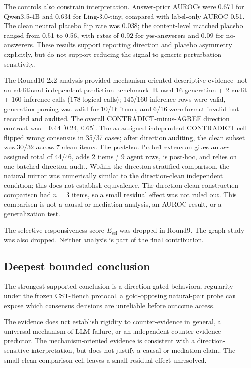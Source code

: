 \documentclass[11pt]{article}
\begin{document}
The controls also constrain interpretation. Answer-prior AUROCs were 0.671 for Qwen3.5-4B and 0.634 for Ling-3.0-tiny, compared with label-only AUROC 0.51. The clean neutral placebo flip rate was 0.038; the content-level matched placebo ranged from 0.51 to 0.56, with rates of 0.92 for yes-answerers and 0.09 for no-answerers. These results support reporting direction and placebo asymmetry explicitly, but do not support reducing the signal to generic perturbation sensitivity.

The Round10 2x2 analysis provided mechanism-oriented descriptive evidence, not an additional independent prediction benchmark. It used 16 generation + 2 audit + 160 inference calls (178 logical calls); 145/160 inference rows were valid, generation parsing was valid for 10/16 items, and 6/16 were format-invalid but recorded and audited. The overall CONTRADICT-minus-AGREE direction contrast was +0.44 [0.24, 0.65]. The as-assigned independent-CONTRADICT cell flipped wrong consensus in 35/37 cases; after direction auditing, the clean subset was 30/32 across 7 clean items. The post-hoc Probe1 extension gives an as-assigned total of 44/46, adds 2 items / 9 agent rows, is post-hoc, and relies on one batched direction audit. Within the direction-stratified comparison, the natural mirror was numerically similar to the direction-clean independent condition; this does not establish equivalence. The direction-clean construction comparison had \(n=3\) items, so a small residual effect was not ruled out. This comparison is not a causal or mediation analysis, an AUROC result, or a generalization test.

The selective-responsiveness score \(E_{\text{sel}}\) was dropped in Round9. The graph study was also dropped. Neither analysis is part of the final contribution.

\subsection{Deepest bounded conclusion}

The strongest supported conclusion is a direction-gated behavioral regularity: under the frozen CST-Bench protocol, a gold-opposing natural-pair probe can expose which consensus decisions are unreliable before outcome access.

The evidence does not establish rigidity to counter-evidence in general, a universal mechanism of LLM failure, or an independent-counter-evidence predictor. The mechanism-oriented evidence is consistent with a direction-sensitive interpretation, but does not justify a causal or mediation claim. The small clean comparison cell leaves a small residual effect unresolved.
\end{document}
